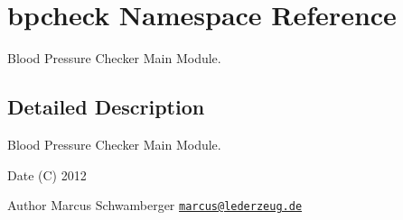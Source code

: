 \hypertarget{namespacebpcheck}{
\section{bpcheck Namespace Reference}
\label{namespacebpcheck}
}


Blood Pressure Checker Main Module.  




\subsection{Detailed Description}
Blood Pressure Checker Main Module. \begin{DoxyDate}{Date}
(C) 2012 
\end{DoxyDate}
\begin{DoxyAuthor}{Author}
Marcus Schwamberger  \href{mailto:marcus@lederzeug.de}{\tt marcus@lederzeug.de} 
\end{DoxyAuthor}
